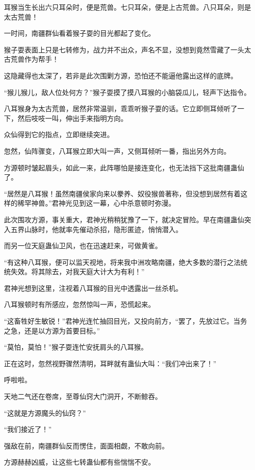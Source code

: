 \begin{this_body}
耳猴当生长出六只耳朵时，便是荒兽。七只耳朵，便是上古荒兽。八只耳朵，则是太古荒兽！

一时间，南疆群仙看着猴子耍的目光都起了变化。

猴子耍表面上只是七转修为，战力并不出众，声名不显，没想到竟然雪藏了一头太古荒兽作为帮手！

这隐藏得也太深了，若非是此次围剿方源，恐怕还不能逼他露出这样的底牌。

“猴儿猴儿，敌人位处何方？”猴子耍摸了摸八耳猴的小脑袋瓜儿，轻声下达指令。

八耳猴身为太古荒兽，居然非常温驯，乖乖听猴子耍的话。它立即侧耳倾听了一下，然后吱吱一叫，伸出手来指明方向。

众仙得到它的指点，立即继续突进。

忽然，仙阵骤变，八耳猴立即大叫一声，又侧耳倾听一番，指出另外方向。

方源顿时皱起眉头，如此一来，此阵哪怕是接连变化，也无法挡下这批南疆蛊仙了。

“居然是八耳猴！虽然南疆侯家向来以豢养、奴役猴兽著称，但没想到居然有着这样的稀罕神兽。”君神光见到这一幕，心中杀意顿时弥漫。

此次围攻方源，事关重大，君神光稍稍犹豫了一下，就决定冒险。早在南疆蛊仙突入五界山脉时，他就率先催动杀招，隐形匿迹，悄悄潜入。

而另一位天庭蛊仙卫风，也在迅速赶来，可做黄雀。

“有这种八耳猴，便可以监天视地，将来我中洲攻略南疆，绝大多数的潜行之法统统失效。将其除去，对我天庭大计大为有利！”

君神光想到这里，注视着八耳猴的目光中透露出一丝杀机。

八耳猴顿时有所感应，忽然惊叫一声，恐慌起来。

“这畜牲好生敏锐！”君神光连忙抽回目光，又投向前方，“罢了，先放过它。当务之急，还是以方源为首要目标。”

“莫怕，莫怕！”猴子耍连忙安抚肩头的八耳猴。

正在这时，忽然视野骤然清明，耳畔就有蛊仙大叫：“我们冲出来了！”

呼啦啦。

天地二气还在卷席，至尊仙窍大门洞开，不断鲸吞。

“这就是方源魔头的仙窍？”

“我们接近了！”

强敌在前，南疆群仙反而愣住，面面相觑，不敢向前。

方源赫赫凶威，让这些七转蛊仙都有些惴惴不安。


\end{this_body}
